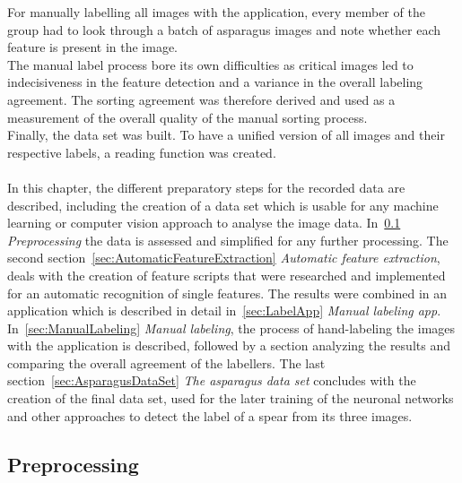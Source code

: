 For manually labelling all images with the application, every member of the group had to look through a batch of asparagus images and note whether each feature is present in the image. \\
The manual label process bore its own difficulties as critical images led to indecisiveness in the feature detection and a variance in the overall labeling agreement. The sorting agreement was therefore derived and used as a measurement of the overall quality of the manual sorting process. \\
Finally, the data set was built. To have a unified version of all images and their respective labels, a reading function was created. \\
\\
In this chapter, the different preparatory steps for the recorded data are described, including the creation of a data set which is usable for any machine learning or computer vision approach to analyse the image data. In~\ref{sec:Preprocessing} \textit{Preprocessing} the data is assessed and simplified for any further processing. The second section~\ref{sec:AutomaticFeatureExtraction} \textit{Automatic feature extraction}, deals with the creation of feature scripts that were researched and implemented for an automatic recognition of single features.
The results were combined in an application which is described in detail in~\ref{sec:LabelApp} \textit{Manual labeling app}. In~\ref{sec:ManualLabeling} \textit{Manual labeling}, the process of hand-labeling the images with the application is described, followed by a section analyzing the results and comparing the overall agreement of the labellers. The last section~\ref{sec:AsparagusDataSet} \textit{The asparagus data set} concludes with the creation of the final data set, used for the later training of the neuronal networks and other approaches to detect the label of a spear from its three images.



\subsection{Preprocessing}
\label{sec:Preprocessing}


